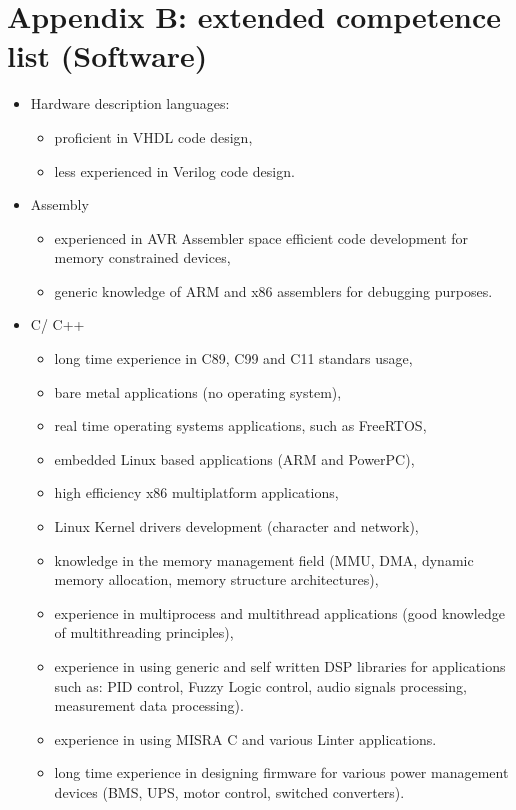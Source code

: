 \documentclass{tccv}
\begin{document}
\section{Appendix B: extended competence list (Software)}

\begin{itemize}
	\item Hardware description languages:
	\begin{itemize}
		\item proficient in VHDL code design,
		\item less experienced in Verilog code design. 
	\end{itemize}
	\item Assembly
		\begin{itemize}
			\item experienced in AVR Assembler space efficient code development for memory constrained devices,
			\item generic knowledge of ARM and x86 assemblers for debugging purposes.
		\end{itemize}
	\item C/ C++
		\begin{itemize}
			\item long time experience in C89, C99 and C11 standars usage,
			\item bare metal applications (no operating system),
			\item real time operating systems applications, such as FreeRTOS,
			\item embedded Linux based applications (ARM and PowerPC),
			\item high efficiency x86 multiplatform applications,
			\item Linux Kernel drivers development (character and network),
			\item knowledge in the memory management field (MMU, DMA, dynamic memory allocation, memory structure architectures),
			\item experience in multiprocess and multithread applications (good knowledge of multithreading principles),
			\item experience in using generic and self written DSP libraries for applications such as: PID control, Fuzzy Logic control, audio signals processing, measurement data processing).
			\item experience in using MISRA C and various Linter applications.
			\item long time experience in designing firmware for various power management devices (BMS, UPS, motor control, switched converters).

\end{itemize}
\end{itemize}
\end{document}
